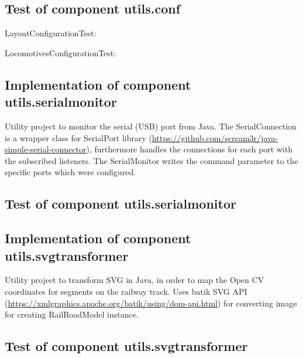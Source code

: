 \subsection{Test of component utils.conf}
LayoutConfigurationTest:

LocomotivesConfigurationTest:


\subsection{Implementation of component utils.serialmonitor}

Utility project to monitor the serial (USB) port from Java. The SerialConnection is a wrapper class for SerialPort library (\url{https://github.com/scream3r/java-simple-serial-connector}), furthermore handles the connections for each port with the subscribed listeners. The SerialMonitor writes the command parameter to the specific ports which were configured.

\subsection{Test of component utils.serialmonitor}

\subsection{Implementation of component utils.svgtransformer}
Utility project to transform SVG in Java, in order to map the Open CV coordinates for segments on the railway track. Uses batik SVG API (\url{https://xmlgraphics.apache.org/batik/using/dom-api.html}) for converting image for creating RailRoadModel instance.

\subsection{Test of component utils.svgtransformer}
